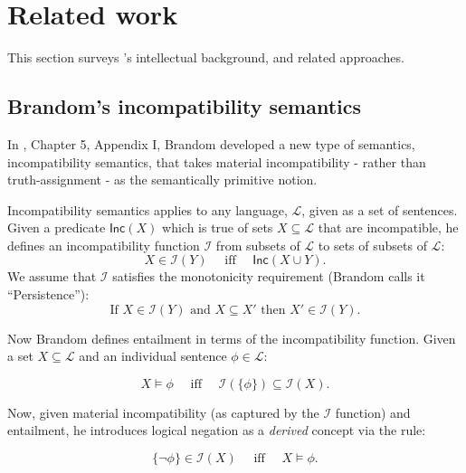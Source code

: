 \section{Related work}\label{relatedWork}


This section surveys  \cathoristic's intellectual background, and related
approaches.



\subsection{Brandom's incompatibility semantics}
\NI In \cite{brandom}, Chapter 5, Appendix I, Brandom developed a new
type of semantics, incompatibility semantics, that takes material
incompatibility - rather than truth-assignment - as the semantically
primitive notion.

Incompatibility semantics applies to any language, $\mathcal{L}$,
given as a set of sentences.  Given a predicate $\mathsf{Inc}(X)$
which is true of sets $X \subseteq \mathcal{L}$ that are incompatible,
he defines an incompatibility function $\mathcal{I}$ from subsets of
$\mathcal{L}$ to sets of subsets of $\mathcal{L}$:
\[
X \in \mathcal{I}(Y) \quad\text{ iff }\quad \mathsf{Inc}(X \cup Y).
\]
We assume that $\mathcal{I}$ satisfies the
monotonicity requirement (Brandom calls it ``Persistence''):
\[
   \text{If } X \in \mathcal{I}(Y) \text{ and } X \subseteq X' \text{ then } X' \in \mathcal{I}(Y).
\]

\NI Now Brandom defines entailment in terms of the incompatibility
function. Given a set $X \subseteq \mathcal{L}$ and an individual
sentence $\phi \in \mathcal{L}$:

\[
   X \models \phi\quad \text{ iff }\quad \mathcal{I}(\{\phi\}) \subseteq \mathcal{I}(X).
\]

\NI Now, given material incompatibility (as captured by the
$\mathcal{I}$ function) and entailment, he introduces logical negation
as a \emph{derived} concept via the rule:

\[
   \{\neg \phi\} \in \mathcal{I}(X)\quad \text{ iff }\quad X \models \phi.
\]

